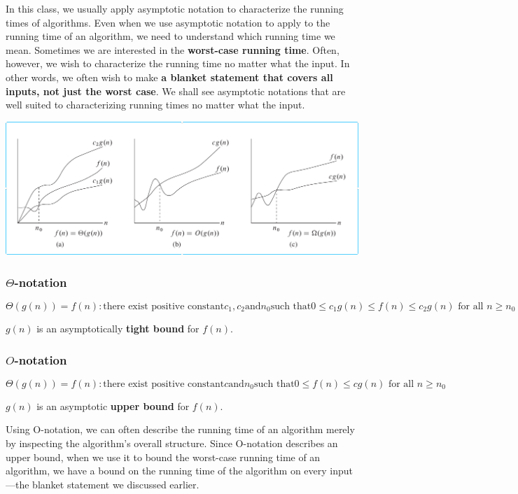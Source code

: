 \documentclass[en,hazy,blue,screen,14pt]{elegantnote}
\begin{document}
In this class, we usually apply asymptotic notation to characterize
the running times of algorithms. Even when we use asymptotic notation
to apply to the running time of an algorithm, we need to understand
which running time we mean. Sometimes we are interested in the \textbf{worst-case
running time}. Often, however, we wish to characterize the running
time no matter what the input. In other words, we often wish to make
\textbf{a blanket statement that covers all inputs, not just the worst
case}. We shall see asymptotic notations that are well suited to characterizing
running times no matter what the input.
\begin{center}
\includegraphics{asymptotic-notion}
\par\end{center}


\subsubsection*{$\Theta$-notation}

\[
\Theta(g(n))={f(n):\text{there exist positive constant}c_{1},c_{2}\text{and}n_{0}\text{such that}0\le c_{1}g(n)\le f(n)\le c_{2}g(n)\text{ for all }n\ge n_{0}}
\]

$g(n)$ is an asymptotically \textbf{tight bound} for $f(n)$.

\subsubsection*{$O$-notation}

\[
\Theta(g(n))={f(n):\text{there exist positive constant}c\text{and}n_{0}\text{such that}0\le f(n)\le cg(n)\text{ for all }n\ge n_{0}}
\]

$g(n)$ is an asymptotic \textbf{upper bound} for $f(n)$.

Using O-notation, we can often describe the running time of an algorithm
merely by inspecting the algorithm\textquoteright s overall structure.
Since O-notation describes an upper bound, when we use it to bound
the worst-case running time of an algorithm, we have a bound on the
running time of the algorithm on every input---the blanket statement
we discussed earlier. 
\end{document}
